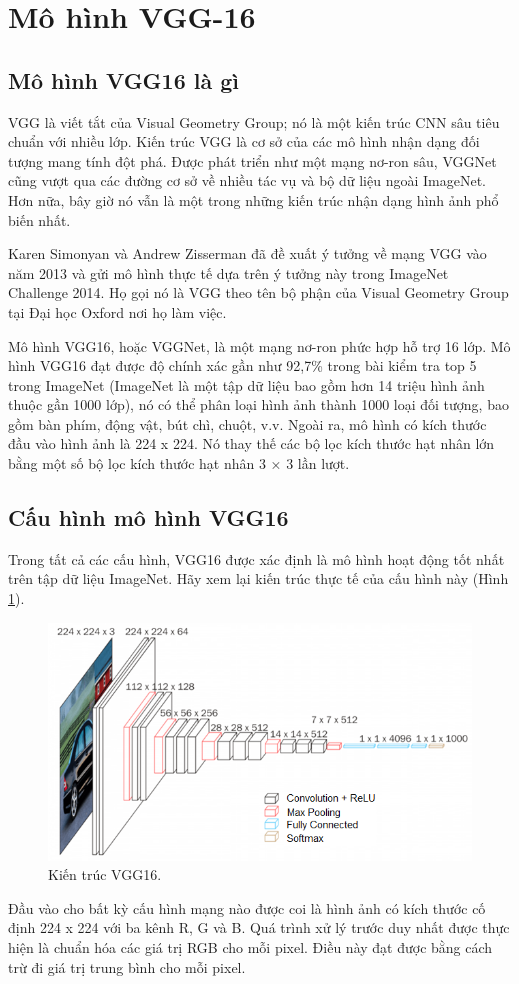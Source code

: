 \section{Mô hình VGG-16}
\subsection{Mô hình VGG16 là gì}
VGG là viết tắt của Visual Geometry Group; nó là một kiến trúc CNN sâu tiêu chuẩn với nhiều lớp. Kiến trúc VGG là cơ sở của các mô hình nhận dạng đối tượng mang tính đột phá. Được phát triển như một mạng nơ-ron sâu, VGGNet cũng vượt qua các đường cơ sở về nhiều tác vụ và bộ dữ liệu ngoài ImageNet. Hơn nữa, bây giờ nó vẫn là một trong những kiến trúc nhận dạng hình ảnh phổ biến nhất.

Karen Simonyan và Andrew Zisserman \cite{vgg16} đã đề xuất ý tưởng về mạng VGG vào năm 2013 và gửi mô hình thực tế dựa trên ý tưởng này trong ImageNet Challenge 2014. Họ gọi nó là VGG theo tên bộ phận của Visual Geometry Group tại Đại học Oxford nơi họ làm việc.

Mô hình VGG16, hoặc VGGNet, là một mạng nơ-ron phức hợp hỗ trợ 16 lớp. Mô hình VGG16 đạt được độ chính xác gần như 92,7\% trong bài kiểm tra top 5 trong ImageNet (ImageNet là một tập dữ liệu bao gồm hơn 14 triệu hình ảnh thuộc gần 1000 lớp), nó có thể phân loại hình ảnh thành 1000 loại đối tượng, bao gồm bàn phím, động vật, bút chì, chuột, v.v. Ngoài ra, mô hình có kích thước đầu vào hình ảnh là 224 x 224. Nó thay thế các bộ lọc kích thước hạt nhân lớn bằng một số bộ lọc kích thước hạt nhân 3 × 3 lần lượt.

\subsection{Cấu hình mô hình VGG16}
Trong tất cả các cấu hình, VGG16 được xác định là mô hình hoạt động tốt nhất trên tập dữ liệu ImageNet. Hãy xem lại kiến trúc thực tế của cấu hình này (Hình \ref{fig:vgg16_imagenet}).
\begin{figure}[H]
	\centering
	\includegraphics[width=0.6\linewidth]{images/vgg16_imagenet}
	\caption{Kiến trúc VGG16.}
	\label{fig:vgg16_imagenet}
\end{figure}
Đầu vào cho bất kỳ cấu hình mạng nào được coi là hình ảnh có kích thước cố định 224 x 224 với ba kênh R, G và B. Quá trình xử lý trước duy nhất được thực hiện là chuẩn hóa các giá trị RGB cho mỗi pixel. Điều này đạt được bằng cách trừ đi giá trị trung bình cho mỗi pixel.

